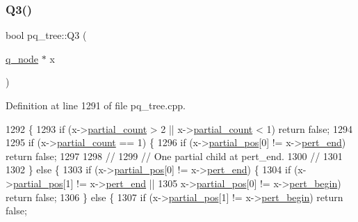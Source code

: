 \subsubsection{\texorpdfstring{Q3()}{Q3()}}
{\footnotesize\ttfamily bool pq\+\_\+tree\+::\+Q3 (\begin{DoxyParamCaption}\item[{\mbox{\hyperlink{classq__node}{q\+\_\+node}} $\ast$}]{x }\end{DoxyParamCaption})\hspace{0.3cm}{\ttfamily [private]}}



Definition at line 1291 of file pq\+\_\+tree.\+cpp.


\begin{DoxyCode}
1292 \{
1293     \textcolor{keywordflow}{if} (x->\mbox{\hyperlink{classq__node_a7ba602eae7be6811ac965bf95521a513}{partial\_count}} > 2 || x->\mbox{\hyperlink{classq__node_a7ba602eae7be6811ac965bf95521a513}{partial\_count}} < 1) \textcolor{keywordflow}{return} \textcolor{keyword}{false};
1294     
1295     \textcolor{keywordflow}{if} (x->\mbox{\hyperlink{classq__node_a7ba602eae7be6811ac965bf95521a513}{partial\_count}} == 1) \{
1296     \textcolor{keywordflow}{if} (x->\mbox{\hyperlink{classq__node_a208c9c95b39a077c27504f7c1e534a52}{partial\_pos}}[0] != x->\mbox{\hyperlink{classq__node_a7a331cc1f5d9f7b4b77b7b25b4976c3b}{pert\_end}}) \textcolor{keywordflow}{return} \textcolor{keyword}{false};
1297     
1298     \textcolor{comment}{//}
1299     \textcolor{comment}{// One partial child at pert\_end.}
1300     \textcolor{comment}{//}
1301     
1302     \} \textcolor{keywordflow}{else} \{
1303     \textcolor{keywordflow}{if} (x->\mbox{\hyperlink{classq__node_a208c9c95b39a077c27504f7c1e534a52}{partial\_pos}}[0] != x->\mbox{\hyperlink{classq__node_a7a331cc1f5d9f7b4b77b7b25b4976c3b}{pert\_end}}) \{
1304         \textcolor{keywordflow}{if} (x->\mbox{\hyperlink{classq__node_a208c9c95b39a077c27504f7c1e534a52}{partial\_pos}}[1] != x->\mbox{\hyperlink{classq__node_a7a331cc1f5d9f7b4b77b7b25b4976c3b}{pert\_end}} || 
1305         x->\mbox{\hyperlink{classq__node_a208c9c95b39a077c27504f7c1e534a52}{partial\_pos}}[0] != x->\mbox{\hyperlink{classq__node_ac636443853e4074a0e6c441d7bcb249a}{pert\_begin}}) \textcolor{keywordflow}{return} \textcolor{keyword}{false};
1306     \} \textcolor{keywordflow}{else} \{
1307         \textcolor{keywordflow}{if} (x->\mbox{\hyperlink{classq__node_a208c9c95b39a077c27504f7c1e534a52}{partial\_pos}}[1] != x->\mbox{\hyperlink{classq__node_ac636443853e4074a0e6c441d7bcb249a}{pert\_begin}}) \textcolor{keywordflow}{return} \textcolor{keyword}{false};

\end{DoxyCode}
